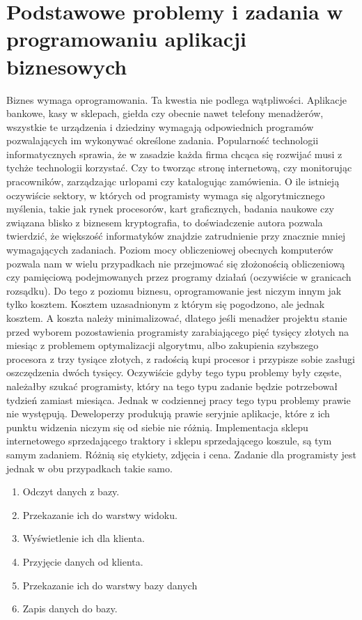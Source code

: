 \documentclass[a4paper,10pt]{report}
\begin{document}
\section{Podstawowe problemy i zadania w programowaniu aplikacji biznesowych}
Biznes wymaga oprogramowania. Ta kwestia nie podlega wątpliwości. Aplikacje bankowe, kasy w sklepach, giełda czy obecnie nawet telefony menadżerów, wszystkie te urządzenia i dziedziny wymagają odpowiednich programów pozwalających im wykonywać określone zadania. Popularność technologii informatycznych sprawia, że w zasadzie każda firma chcąca się rozwijać musi z tychże technologii korzystać. Czy to tworząc stronę internetową, czy monitorując pracowników, zarządzając urlopami czy katalogując zamówienia. O ile istnieją oczywiście sektory, w których od programisty wymaga się algorytmicznego myślenia, takie jak rynek procesorów, kart graficznych, badania naukowe czy związana blisko z biznesem kryptografia, to doświadczenie autora pozwala twierdzić, że większość informatyków znajdzie zatrudnienie przy znacznie mniej wymagających zadaniach. Poziom mocy obliczeniowej obecnych komputerów pozwala nam w wielu przypadkach nie przejmować się złożonością obliczeniową czy pamięciową podejmowanych przez programy działań (oczywiście w granicach rozsądku). Do tego z poziomu biznesu, oprogramowanie jest niczym innym jak tylko kosztem. Kosztem uzasadnionym z którym się pogodzono, ale jednak kosztem. A koszta należy minimalizować, dlatego jeśli menadżer projektu stanie przed wyborem pozostawienia programisty zarabiającego pięć tysięcy złotych na miesiąc z problemem optymalizacji algorytmu, albo zakupienia szybszego procesora z trzy tysiące złotych, z radością kupi procesor i przypisze sobie zasługi oszczędzenia dwóch tysięcy. Oczywiście gdyby tego typu problemy były częste, należałby szukać programisty, który na tego typu zadanie będzie potrzebował tydzień zamiast miesiąca. Jednak w codziennej pracy tego typu problemy prawie nie występują. Deweloperzy produkują prawie seryjnie aplikacje, które z ich punktu widzenia niczym się od siebie nie różnią. Implementacja sklepu internetowego sprzedającego traktory i sklepu sprzedającego koszule, są tym samym zadaniem. Różnią się etykiety, zdjęcia i cena. Zadanie dla programisty jest jednak w obu przypadkach takie samo. 
\begin{enumerate}
	\item Odczyt danych z bazy. 
	\item Przekazanie ich do warstwy widoku. 
	\item Wyświetlenie ich dla klienta.
	\item Przyjęcie danych od klienta.
	\item Przekazanie ich do warstwy bazy danych
	\item Zapis danych do bazy.
\end{enumerate}
\end{document}
